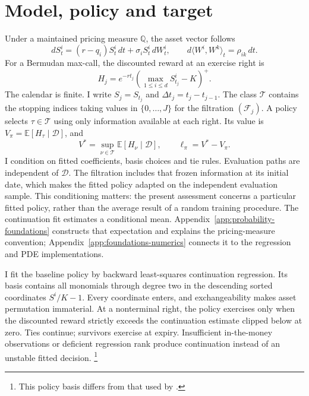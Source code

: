 \documentclass[11pt]{article}
\newcommand{\E}{\mathbb E}
\newcommand{\Q}{\mathbb Q}
\newcommand{\F}{\mathcal F}
\newcommand{\positive}[1]{\left(#1\right)^+}
\begin{document}
\section{Model, policy and target}
\label{sec:model}

Under a maintained pricing measure $\Q$, the asset vector follows
\begin{equation}
 dS^i_t=(r-q_i)S^i_t\,dt+\sigma_i S^i_t\,dW^i_t,
 \qquad d\langle W^i,W^k\rangle_t=\rho_{ik}\,dt.
\label{eq:gbm}
\end{equation}
For a Bermudan max-call, the discounted reward at an exercise right is
\begin{equation}
 H_j=e^{-rt_j}\positive{\max_{1\le i\le d}S^i_{t_j}-K}.
\end{equation}
The calendar is finite. I write $S_j=S_{t_j}$ and $\Delta t_j=t_j-t_{j-1}$. The class $\mathcal T$ contains the stopping indices taking values in $\{0,\ldots,J\}$ for the filtration $(\F_j)$. A policy selects $\tau\in\mathcal T$ using only information available at each right. Its value is $V_\pi=\E[H_\tau\mid\mathcal D]$, and
\begin{equation}
 V^*=\sup_{\nu\in\mathcal T}\E[H_\nu\mid\mathcal D],
 \qquad \ell_\pi=V^*-V_\pi.
\end{equation}
I condition on fitted coefficients, basis choices and tie rules. Evaluation paths are independent of $\mathcal D$. The filtration includes that frozen information at its initial date, which makes the fitted policy adapted on the independent evaluation sample. This conditioning matters: the present assessment concerns a particular fitted policy, rather than the average result of a random training procedure. The continuation fit estimates a conditional mean. Appendix~\ref{app:probability-foundations} constructs that expectation and explains the pricing-measure convention; Appendix~\ref{app:foundations-numerics} connects it to the regression and PDE implementations.

I fit the baseline policy by backward least-squares continuation regression. Its basis contains all monomials through degree two in the descending sorted coordinates $S^i/K-1$. Every coordinate enters, and exchangeability makes asset permutation immaterial. At a nonterminal right, the policy exercises only when the discounted reward strictly exceeds the continuation estimate clipped below at zero. Ties continue; survivors exercise at expiry. Insufficient in-the-money observations or deficient regression rank produce continuation instead of an unstable fitted decision. \footnote{This policy basis differs from that used by \citet{andersen2004}.}
\end{document}
